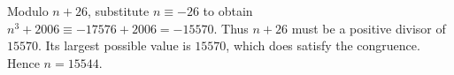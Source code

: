 Modulo $n+26$, substitute $n\equiv-26$ to obtain $n^3+2006\equiv-17576+2006=-15570$. Thus $n+26$ must be a positive divisor of $15570$. Its largest possible value is $15570$, which does satisfy the congruence. Hence $\boxed{n=15544}$.
